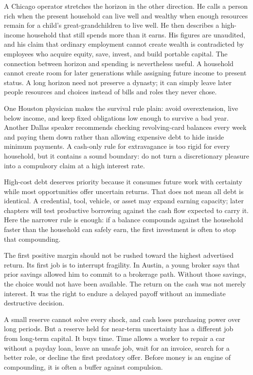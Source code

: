A Chicago operator stretches the horizon in the other direction. He calls a
person rich when the present household can live well and wealthy when enough
resources remain for a child's great-grandchildren to live well. He then
describes a high-income household that still spends more than it earns. His
figures are unaudited, and his claim that ordinary employment cannot create
wealth is contradicted by employees who acquire equity, save, invest, and build
portable capital. The connection between horizon and spending is nevertheless useful.
A household cannot create room for later generations while assigning future
income to present status. A long horizon need not preserve a dynasty; it can
simply leave later people resources and choices instead of bills and roles they
never chose.

One Houston physician makes the survival rule plain: avoid overextension, live
below income, and keep fixed obligations low enough to survive a bad year.
Another Dallas speaker recommends checking revolving-card balances every week
and paying them down rather than allowing expensive debt to hide inside minimum
payments. A cash-only rule for extravagance is too rigid for every household,
but it contains a sound boundary: do not turn a discretionary pleasure into a
compulsory claim at a high interest rate.

High-cost debt deserves priority because it consumes future work with
certainty while most opportunities offer uncertain returns. That does not mean
all debt is identical. A credential, tool, vehicle, or asset may expand earning
capacity; later chapters will test productive borrowing against the cash flow
expected to carry it. Here the narrower rule is enough: if a balance compounds
against the household faster than the household can safely earn, the first
investment is often to stop that compounding.

The first positive margin should not be rushed toward the highest advertised
return. Its first job is to interrupt fragility. In Austin, a young broker says
that prior savings allowed him to commit to a brokerage path. Without those
savings, the choice would not have been available. The return on the cash was
not merely interest. It was the right to endure a delayed payoff without an
immediate destructive decision.

A small reserve cannot solve every shock, and cash loses purchasing power over
long periods. But a reserve held for near-term uncertainty has a different job
from long-term capital. It buys time. Time allows a worker to repair a car
without a payday loan, leave an unsafe job, wait for an invoice, search for a
better role, or decline the first predatory offer. Before money is an engine of
compounding, it is often a buffer against compulsion.

